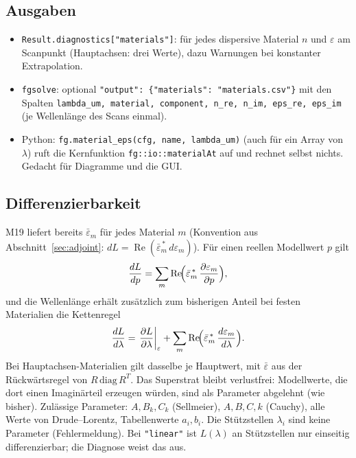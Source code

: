 \subsection{Ausgaben}
\begin{itemize}[nosep]
  \item \verb|Result.diagnostics["materials"]|: für jedes dispersive Material $n$ und $\varepsilon$ am Scanpunkt
        (Hauptachsen: drei Werte), dazu Warnungen bei konstanter Extrapolation.
  \item \verb|fgsolve|: optional \verb|"output": {"materials": "materials.csv"}| mit den Spalten
        \verb|lambda_um, material, component, n_re, n_im, eps_re, eps_im| (je Wellenlänge des Scans einmal).
  \item Python: \verb|fg.material_eps(cfg, name, lambda_um)| (auch für ein Array von $\lambda$) ruft die
        Kernfunktion \verb|fg::io::materialAt| auf und rechnet selbst nichts. Gedacht für Diagramme und die GUI.
\end{itemize}

\subsection{Differenzierbarkeit}\label{sec:disp_adj}
M19 liefert bereits $\bar\varepsilon_m$ für jedes Material $m$ (Konvention aus Abschnitt~\ref{sec:adjoint}:
$dL=\operatorname{Re}(\bar\varepsilon_m^{\,*}\,d\varepsilon_m)$). Für einen reellen Modellwert $p$ gilt
\begin{equation}\label{eq:disp_grad_p}
  \frac{dL}{dp}=\sum_m\operatorname{Re}\!\Bigl(\bar\varepsilon_m^{\,*}\,\frac{\partial\varepsilon_m}{\partial p}\Bigr),
\end{equation}
und die Wellenlänge erhält zusätzlich zum bisherigen Anteil bei festen Materialien die Kettenregel
\begin{equation}\label{eq:disp_grad_lambda}
  \frac{dL}{d\lambda}=\left.\frac{\partial L}{\partial\lambda}\right|_{\varepsilon}
  +\sum_m\operatorname{Re}\!\Bigl(\bar\varepsilon_m^{\,*}\,\frac{d\varepsilon_m}{d\lambda}\Bigr).
\end{equation}
Bei Hauptachsen-Materialien gilt dasselbe je Hauptwert, mit $\bar\varepsilon$ aus der Rückwärtsregel von
$R\,\mathrm{diag}\,R^T$. Das Superstrat bleibt verlustfrei: Modellwerte, die dort einen Imaginärteil erzeugen
würden, sind als Parameter abgelehnt (wie bisher). Zulässige Parameter: $A,B_k,C_k$ (Sellmeier),
$A,B,C,k$ (Cauchy), alle Werte von Drude--Lorentz, Tabellenwerte $a_i,b_i$. Die Stützstellen $\lambda_i$ sind keine
Parameter (Fehlermeldung). Bei \verb|"linear"| ist $L(\lambda)$ an Stützstellen nur einseitig differenzierbar; die
Diagnose weist das aus.

